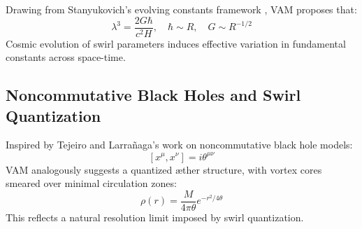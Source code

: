 \documentclass[11pt]{article}
\begin{document}
    Drawing from Stanyukovich’s evolving constants framework \cite{stanyukovich2008evolution}, VAM proposes that:
    \[
        \lambda^3 = \frac{2G\hbar}{c^2 H}, \quad \hbar \sim R, \quad G \sim R^{-1/2}
    \]
    Cosmic evolution of swirl parameters induces effective variation in fundamental constants across space-time.

    \subsection*{Noncommutative Black Holes and Swirl Quantization}

    Inspired by Tejeiro and Larrañaga’s work \cite{tejeiro2011noncomm} on noncommutative black hole models:
    \[
        [x^\mu, x^\nu] = i \theta^{\mu\nu}
    \]
    VAM analogously suggests a quantized æther structure, with vortex cores smeared over minimal circulation zones:
    \[
        \rho(r) = \frac{M}{4\pi \theta} e^{-r^2/4\theta}
    \]
    This reflects a natural resolution limit imposed by swirl quantization.



    \ifdefined\standalonechapter\else
    
    
\end{document}
